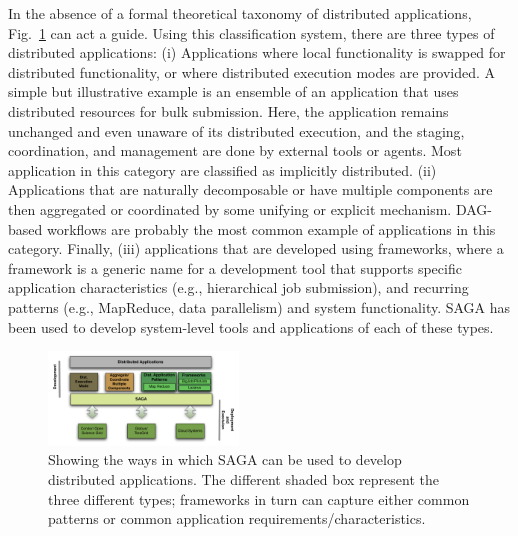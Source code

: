 \documentclass[conference,final]{IEEEtran}
\begin{document}
In the absence of a formal theoretical taxonomy of distributed
applications, Fig.~\ref{Fig:sagaapps} can act a guide.  Using this
classification system, there are three types of distributed
applications: (i) Applications where local functionality is swapped
for distributed functionality, or where distributed execution modes
are provided.  A simple but illustrative example is an ensemble of an
application that uses distributed resources for bulk submission. Here,
the application remains unchanged and even unaware of its distributed
execution, and the staging, coordination, and management are done by
external tools or agents. Most application in this category are
classified as implicitly distributed.  (ii) Applications that are
naturally decomposable or have multiple components are then aggregated
or coordinated by some unifying or explicit mechanism.  DAG-based
workflows are probably the most common example of applications in this
category.
Finally, (iii) applications that are developed using frameworks, where
a framework is a generic name for a development tool that supports
specific application characteristics (e.g., hierarchical job
submission), and recurring patterns (e.g., MapReduce, data
parallelism) and system functionality.  SAGA has been used to develop
system-level tools and applications of each of these types.

   \begin{figure}[!ht]
     \begin{center}
       \includegraphics[width=0.45\textwidth]{distributed_applications_saga_figure.pdf}
     \end{center}
     \caption{\small Showing the ways in which
         SAGA can be used to develop distributed applications.
         The different shaded box represent the three different types;
         frameworks in turn can capture either common patterns or common
         application requirements/characteristics. \label{Fig:sagaapps}}
   \end{figure}
\end{document}

